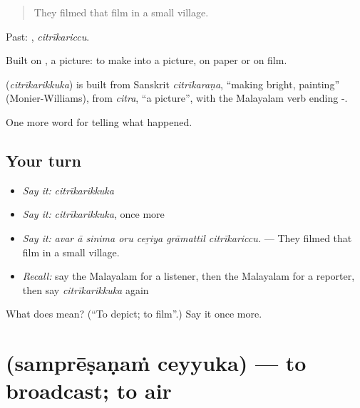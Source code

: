 \begin{quote}
They filmed that film in a small village.
\end{quote}

Past: , \emph{citrīkariccu}.

Built on , a picture: to make into a picture, on paper or on film.

\begin{cousinweb}
\textbf{} (\emph{citrīkarikkuka}) is built from Sanskrit \emph{citrīkaraṇa}, \textquotedblleft{}making bright, painting\textquotedblright{} (Monier-Williams), from \emph{citra}, \textquotedblleft{}a picture\textquotedblright{}, with the Malayalam verb ending -.
\end{cousinweb}

\begin{grammarlens}[title={What you've built}]
One more word for telling what happened.
\end{grammarlens}

\subsection*{Your turn}
\begin{itemize}
\raggedright
  \item \emph{Say it:} \emph{citrīkarikkuka}
  \item \emph{Say it:} \emph{citrīkarikkuka}, once more
  \item \emph{Say it:} \emph{avar ā sinima oru ceṟiya grāmattil citrīkariccu.} — They filmed that film in a small village.
  \item \emph{Recall:} say the Malayalam for a listener, then the Malayalam for a reporter, then say \emph{citrīkarikkuka} again
\end{itemize}

\begin{tcolorbox}[breakable,colback=teal!4,colframe=teal!35!black,title={Before you move on}]
What does  mean? (\textquotedblleft{}To depict; to film\textquotedblright{}.) Say it once more.
\end{tcolorbox}
\section[\texorpdfstring{\ml{സംപ്രേഷണം} \ml{ചെയ്യുക} (samprēṣaṇaṁ ceyyuka)}{സംപ്രേഷണം ചെയ്യുക (samprēṣaṇaṁ ceyyuka)}]{  (samprēṣaṇaṁ ceyyuka) — to broadcast; to air}

